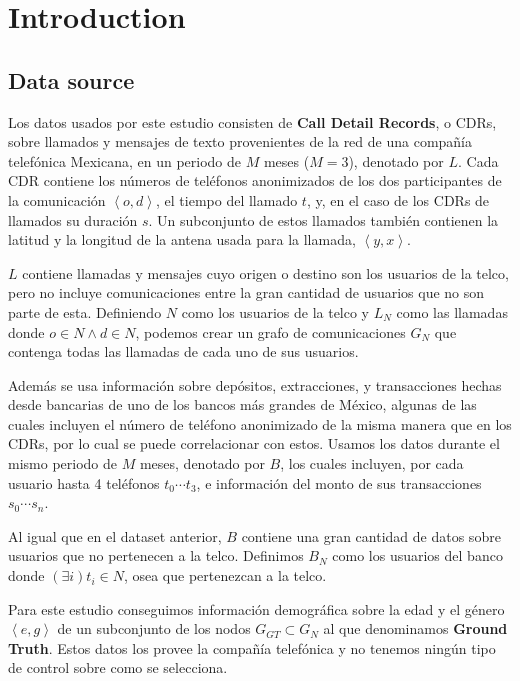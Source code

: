 \section{Introduction}

\subsection{Data source}

Los datos usados por este estudio consisten de \textbf{Call Detail Records}, o CDRs, sobre llamados y mensajes de texto provenientes de la red de una compañía telefónica Mexicana, en un periodo de \( M \) meses (\( M = 3 \)), denotado por \( L \). Cada CDR contiene los números de teléfonos anonimizados de los dos participantes de la comunicación \(\left<o, d\right>\), el tiempo del llamado \(t\), y, en el caso de los CDRs de llamados su duración \(s\). Un subconjunto de estos llamados también contienen la latitud y la longitud de la antena usada para la llamada, \(\left<y, x\right>\).

\( L \) contiene llamadas y mensajes cuyo origen o destino son los usuarios de la telco, pero no incluye comunicaciones entre la gran cantidad de usuarios que no son parte de esta. Definiendo \( N \) como los usuarios de la telco y \( L_N \) como las llamadas donde \( o \in N \wedge d \in N \), podemos crear un grafo de comunicaciones \( G_N \) que contenga todas las llamadas de cada uno de sus usuarios.

Además se usa información sobre depósitos, extracciones, y transacciones hechas desde bancarias de uno de los bancos más grandes de México, algunas de las cuales incluyen el número de teléfono anonimizado de la misma manera que en los CDRs, por lo cual se puede correlacionar con estos. Usamos los datos durante el mismo periodo de \( M \) meses, denotado por \( B \), los cuales incluyen, por cada usuario hasta 4 teléfonos \( t_0 \cdots t_3 \), e información del monto de sus transacciones \( s_0 \cdots s_n \).

Al igual que en el dataset anterior, \( B \) contiene una gran cantidad de datos sobre usuarios que no pertenecen a la telco. Definimos \( B_N \) como los usuarios del banco donde \( \left( \exists i \right) t_i \in N \), osea que pertenezcan a la telco.

Para este estudio conseguimos información demográfica sobre la edad y el género \( \left<e, g\right> \) de un subconjunto de los nodos \( G_{GT} \subset G_N \) al que denominamos \textbf{Ground Truth}. Estos datos los provee la compañía telefónica y no tenemos ningún tipo de control sobre como se selecciona.

